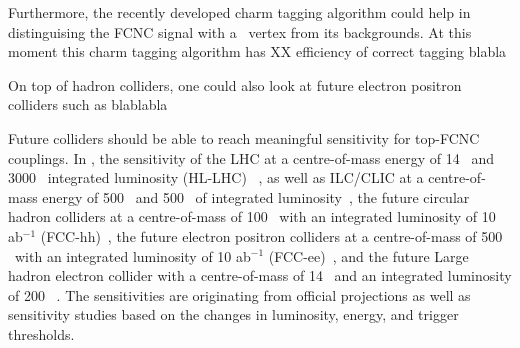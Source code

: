Furthermore, the recently developed charm tagging algorithm could help in distinguising the FCNC signal with a \Zct\ vertex from its backgrounds. At this moment this charm tagging algorithm has XX efficiency of correct tagging blabla


On top of hadron colliders, one could also look at future electron positron colliders such as blablabla


Future colliders should be able to reach meaningful sensitivity for top-FCNC couplings. In , the sensitivity of the LHC at a centre-of-mass energy of 14 \TeV\ and 3000 \fbinv\ integrated luminosity (HL-LHC)~\cite{Agashe:2013hma} , as well as ILC/CLIC at a centre-of-mass energy of 500 \GeV\ and 500 \fbinv\ of integrated luminosity~\cite{Mangano:2016jyj}, the  future circular hadron colliders at a centre-of-mass of 100 \TeV\ with an integrated luminosity of 10 ab$^{-1}$ (FCC-hh)~\cite{Agashe:2013hma}, the future electron positron colliders at a centre-of-mass of 500 \GeV\ with an integrated luminosity of 10 ab$^{-1}$ (FCC-ee)~\cite{Khanpour:2014xla}, and the future Large hadron electron collider with a centre-of-mass of 14 \TeV\ and an integrated luminosity of 200 \fbinv~\cite{Liu:2015kkp}. The sensitivities are originating from official projections as well as sensitivity studies based on the changes in luminosity, energy, and trigger thresholds. 

